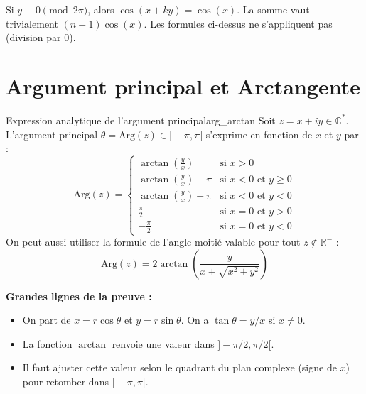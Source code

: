 \documentclass{prepacours}
\begin{document}
\begin{exemple}
    Si $y \equiv 0 \pmod{2\pi}$, alors $\cos(x+ky) = \cos(x)$. La somme vaut trivialement $(n+1)\cos(x)$. Les formules ci-dessus ne s'appliquent pas (division par 0).
\end{exemple}

\section{Argument principal et Arctangente}

\begin{proposition}{Expression analytique de l'argument principal}{arg_arctan}
    Soit $z = x+iy \in \mathbb{C}^*$. L'argument principal $\theta = \text{Arg}(z) \in ]-\pi, \pi]$ s'exprime en fonction de $x$ et $y$ par :
    \[
    \text{Arg}(z) =
    \begin{cases}
    \arctan\left(\frac{y}{x}\right) & \text{si } x > 0 \\
    \arctan\left(\frac{y}{x}\right) + \pi & \text{si } x < 0 \text{ et } y \ge 0 \\
    \arctan\left(\frac{y}{x}\right) - \pi & \text{si } x < 0 \text{ et } y < 0 \\
    \frac{\pi}{2} & \text{si } x = 0 \text{ et } y > 0 \\
    -\frac{\pi}{2} & \text{si } x = 0 \text{ et } y < 0
    \end{cases}
    \]
    On peut aussi utiliser la formule de l'angle moitié valable pour tout $z \notin \mathbb{R}^-$ :
    \[ \text{Arg}(z) = 2 \arctan\left( \frac{y}{x + \sqrt{x^2+y^2}} \right) \]
\end{proposition}

\noindent \textbf{Grandes lignes de la preuve :}
\begin{itemize}
    \item On part de $x = r\cos\theta$ et $y=r\sin\theta$. On a $\tan\theta = y/x$ si $x \neq 0$.
    \item La fonction $\arctan$ renvoie une valeur dans $]-\pi/2, \pi/2[$.
    \item Il faut ajuster cette valeur selon le quadrant du plan complexe (signe de $x$) pour retomber dans $]-\pi, \pi]$.
\end{itemize}
\end{document}
